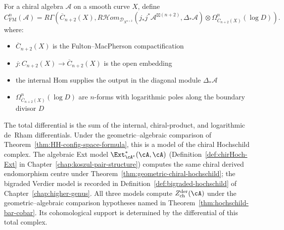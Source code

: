 \begin{definition}
\label{def:chiral-hochschild-complex}
For a chiral algebra $\mathcal{A}$ on a smooth curve $X$, define
\[
C^n_{\mathrm{FM}}(\mathcal A)
=
R\Gamma\!\left(
\overline{C}_{n+2}(X),
R\mathcal{H}om_{\mathcal D_{X^{n+2}}}
\!\left(j_*j^*\mathcal A^{\boxtimes(n+2)},\Delta_*\mathcal A\right)
\otimes\Omega^n_{\overline C_{n+2}(X)}(\log D)
\right).
\]
where:
\begin{itemize}
\item $\overline{C}_{n+2}(X)$ is the Fulton--MacPherson compactification
\item $j: C_{n+2}(X) \to \overline{C}_{n+2}(X)$ is the open embedding
\item the internal Hom supplies the output in the diagonal module
  $\Delta_*\mathcal A$
\item $\Omega^n_{\overline{C}_{n+2}(X)}(\log D)$ are $n$-forms with logarithmic poles along the boundary divisor $D$
\end{itemize}
The total differential is the sum of the internal, chiral-product, and
logarithmic de~Rham differentials.  Under the geometric--algebraic
comparison of Theorem~\ref{thm:HH-config-space-formula}, this is a
model of the chiral Hochschild complex.  The algebraic Ext model
$\Ext^*_{\cA^e}(\cA,\cA)$
\textup{(}Definition~\textup{\ref{def:chirHoch-Ext}} in
Chapter~\textup{\ref{chap:koszul-pair-structure}}\textup{)} computes
the same chiral derived endomorphism centre under
Theorem~\textup{\ref{thm:geometric-chiral-hochschild}}; the bigraded
Verdier model is recorded in
Definition~\textup{\ref{def:bigraded-hochschild}} of
Chapter~\textup{\ref{chap:higher-genus}}. All three
models compute $Z^{\mathrm{der}}_{\mathrm{ch}}(\cA)$ under the
geometric--algebraic comparison hypotheses named in
Theorem~\textup{\ref{thm:hochschild-bar-cobar}}.  Its cohomological
support is determined by the differential of this total complex.
\end{definition}

